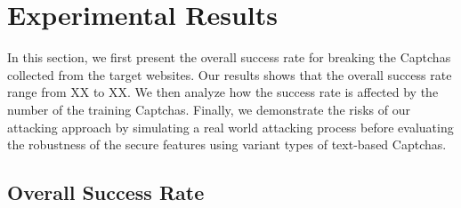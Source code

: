 \section{Experimental Results} 
In this section, we first present the overall success rate for breaking the Captchas collected from the target websites. Our results shows that the overall success rate range from XX to XX. 
We then analyze how the success rate is affected by the number of the training Captchas.
Finally, we demonstrate the risks of our attacking approach by simulating a real world attacking process before evaluating the robustness of the secure features using variant types of text-based Captchas.

\subsection{Overall Success Rate}
